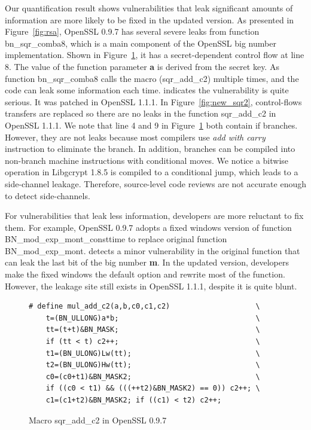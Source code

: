 Our quantification result shows vulnerabilities
that leak significant amounts of information
are more likely to be fixed in the updated version.
As presented in Figure~\ref{fig:rsa}, 
OpenSSL 0.9.7 has several severe leaks from
function \textsf{bn\_sqr\_comba8}, which is a main 
component of the OpenSSL big number implementation.
Shown in Figure~\ref{fig:old_sqr2}, it has a 
secret-dependent control flow at line 8.
The value of the function parameter \textbf{a} is derived from
the secret key. 
As function \textsf{bn\_sqr\_comba8}
calls the macro (\textsf{sqr\_add\_c2}) multiple times, 
and the code can leak some information each time.
\tool{} indicates the vulnerability is quite serious. 
It was patched in OpenSSL 1.1.1. In 
Figure~\ref{fig:new_sqr2}, control-flows transfers are replaced
so there are no leaks in the function
\textsf{sqr\_add\_c2} in OpenSSL 1.1.1. We note
that line 4 and 9 in Figure~\ref{fig:old_sqr2} both contain if branches.
However, they are not leaks because
most compilers use \emph{add with carry} instruction to eliminate the branch.
In addition, branches can be compiled into non-branch machine instructions 
with conditional moves. 
We notice a bitwise operation in Libgcrypt 1.8.5 is compiled to a conditional 
jump, which leads to a side-channel leakage.
Therefore, source-level code reviews are not accurate
enough to detect side-channels. 

For vulnerabilities that leak less information,
developers are more reluctant to fix them. 
For example, OpenSSL 0.9.7 adopts a fixed windows version of 
function \textsf{BN\_mod\_exp\_mont\_consttime} to replace original function
\textsf{BN\_mod\_exp\_mont}.
\tool{} detects a minor vulnerability in the original function that can
leak the last bit of the big number \textbf{m}. In the updated version,
developers make the fixed windows the default option and rewrite most of the 
function. However, the leakage site still exists in OpenSSL 1.1.1,
despite it is quite blunt. 
\begin{figure}
    \centering
    \begin{lstlisting}[xleftmargin=.02\textwidth,xrightmargin=.01\textwidth]
# define mul_add_c2(a,b,c0,c1,c2)                    \
    t=(BN_ULLONG)a*b;                                \
    tt=(t+t)&BN_MASK;                                \
    if (tt < t) c2++;                                \
    t1=(BN_ULONG)Lw(tt);                             \
    t2=(BN_ULONG)Hw(tt);                             \
    c0=(c0+t1)&BN_MASK2;                             \
    if ((c0 < t1) && (((++t2)&BN_MASK2) == 0)) c2++; \
    c1=(c1+t2)&BN_MASK2; if ((c1) < t2) c2++;
\end{lstlisting}
    \vspace*{-6pt}
    \caption{Macro \textsf{sqr\_add\_c2} in OpenSSL 0.9.7}
    \label{fig:old_sqr2}
    \vspace*{-8pt}
\end{figure}


